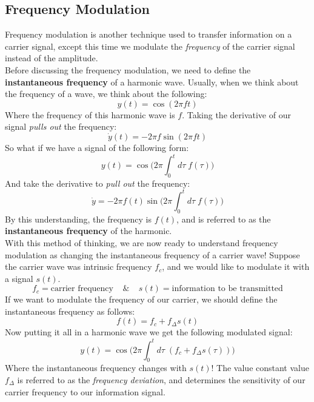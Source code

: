 \documentclass[a4paper]{article}
\numberwithin{equation}{section}
\begin{document}
\subsection{Frequency Modulation}
Frequency modulation is another technique used to transfer information on a carrier signal, except this time we modulate the \textit{frequency} of the carrier signal instead of the amplitude.\\

Before discussing the frequency modulation, we need to define the \textbf{instantaneous frequency} of a harmonic wave. Usually, when we think about the frequency of a wave, we think about the following:
\begin{equation}
y(t)=\cos{(2\pi f t)}
\end{equation}
Where the frequency of this harmonic wave is $f$. Taking the derivative of our signal \textit{pulls out} the frequency:
\begin{equation}
\dot{y}(t)=-2\pi f\sin{(2\pi f t)}
\end{equation}
So what if we have a signal of the following form:
\begin{equation}
y(t)=\cos{\big(2\pi \int_0^{t}d\tau \;  f(\tau)\big)}
\end{equation}
And take the derivative to \textit{pull out} the frequency:
\begin{equation}
\dot{y}=-2\pi f(t) \sin{\big(2\pi \int_0^{t}d\tau \;  f(\tau)\big)}
\end{equation}
By this understanding, the frequency is $f(t)$, and is referred to as the \textbf{instantaneous frequency} of the harmonic.\\

With this method of thinking, we are now ready to understand frequency modulation as changing the instantaneous frequency of a carrier wave! Suppose the carrier wave was intrinsic frequency $f_c$, and we would like to modulate it with a signal $s(t)$.
\begin{equation}
f_c = \text{carrier frequency} \: \: \: \: \: \& \: \: \: \: \: s(t) = \text{information to be transmitted}
\end{equation}
If we want to modulate the frequency of our carrier, we should define the instantaneous frequency as follows:
\begin{equation}
f(t) = f_c + f_\Delta s(t)
\end{equation}
Now putting it all in a harmonic wave we get the following modulated signal:
\begin{equation}
y(t)=\cos{\big(2\pi \int_0^{t}d\tau \;  (f_c+f_\Delta s(\tau))\big)}
\end{equation}
Where the instantaneous frequency changes with $s(t)$! The value constant value $f_\Delta$ is referred to as the \textit{frequency deviation}, and determines the sensitivity of our carrier frequency to our information signal.\\
\end{document}
